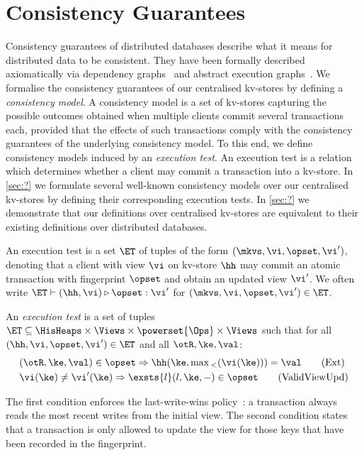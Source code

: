 \section{Consistency Guarantees}
\label{sec:cm}
Consistency guarantees of distributed databases describe
what it means for distributed data to be consistent. 
They have been formally described axiomatically via dependency graphs~\cite{adya-icde,adya}
and abstract execution graphs~\cite{.}. 
We formalise the consistency guarantees of our centralised kv-stores by defining a 
\emph{consistency model}. 
A consistency model is a set of kv-stores capturing the possible outcomes 
obtained when multiple clients commit several transactions each, 
provided that the effects of such transactions comply with the consistency guarantees of the underlying consistency model. 
To this end, we define consistency models induced by an \emph{execution test}.
An execution test is a relation which determines whether a client may commit a transaction into a kv-store.  
In \cref{sec:?} we formulate several well-known consistency models over our centralised kv-stores 
by defining their corresponding execution tests. 
In \cref{sec:?} we demonstrate that our definitions over centralised kv-stores are equivalent 
to their existing definitions over distributed databases.




An execution test is a set $\ET$ of tuples of the form $(\mkvs, \vi, \opset, \vi')$,
denoting that a client with view $\vi$ on kv-store $\hh$  may commit an atomic transaction 
with fingerprint $\opset$  and obtain an updated view $\vi'$. 
We often write
$\ET \vdash (\hh, \vi) \triangleright \opset: \vi'$ for
$(\mkvs, \vi, \opset, \vi') \in \ET$.


\begin{definition}
\label{def:execution.test}
An \emph{execution test} is a set of tuples $\ET \subseteq \HisHeaps \times \Views \times \powerset{\Ops} \times \Views$ 
such that for all $(\hh, \vi, \opset, \vi') \in \ET$ and all $\otR, \ke, \val$:
\begin{align}
    & 
	(\otR, \ke, \val) \in \opset \Rightarrow
	\hh(\ke, \max{}_{<}(\vi(\ke))) = \val  
	\tag{Ext} \label{eq:read-external} \\
    & 
    \vi(\ke) \neq \vi'(\ke) 
    \Rightarrow
    \exsts{l} (l, \ke, -) \in \opset
    \tag{ValidViewUpd} \label{eq:valid-view-update}
\end{align}
\end{definition}
%
\noindent 
The first condition enforces the last-write-wins policy~\cite{}: 
a transaction always reads the most recent writes from the initial view.  
The second condition states that a transaction is only allowed to update the view for those keys 
that have been recorded in the fingerprint.  


